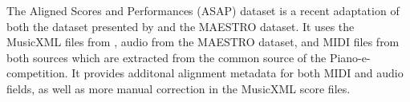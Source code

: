 The Aligned Scores and Performances (ASAP) dataset \cite{foscarin2020asap} is a recent adaptation of both the dataset presented by \citet{jeong2019virtuosonet} and the MAESTRO dataset. It uses the MusicXML files from \citet{jeong2019virtuosonet}, audio from the MAESTRO dataset, and MIDI files from both sources which are extracted from the common source of the Piano-e-competition. It provides additonal alignment metadata for both MIDI and audio fields, as well as more manual correction in the MusicXML score files. 

